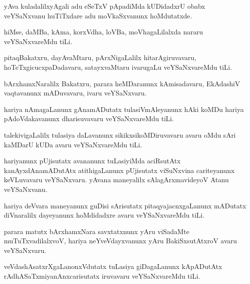 \begin{mng}
yAva kuladalilxyAgali adu eSeTxV pApadiMda kUDidadxrU obabx veYSaNxvanu huTiTxdare adu moVkaSxvanunx hoMdutatxde.
\end{mng}

\begin{mng}
hiMse, daMBa, kAma, korxVdha, loVBa, moVhagaLilalxda nararu veYSaNxvareMdu tiLi.
\end{mng}

\begin{mng}
pitaqBakatxru, dayAvaMtaru, pArxNigaLalilx hitarAgiruvavaru, hoTeTxgicucxpaDadavaru, satayxvaMtaru ivarugaLu veYSaNxvareMdu tiLi.
\end{mng}

\begin{mng}
bArxhamxNaralilx Bakatxru, parara heMDaranunx kAmisadavaru, EkAdashiV vaqtavanunx mADuvavaru, ivaru veYSaNxvaru.
\end{mng}

\begin{mng}
hariya nAmagaLanunx gAnamADutatx tulasiVmAleyanunx hAki koMDu hariya pAdoVdakavanunx dharisuvavaru veYSaNxvareMdu tiLi.
\end{mng}

\begin{mng}
talekivigaLalilx tulasiya daLavanunx sikikxsikoMDiruvavaru avaru oMdu sAri kaMDarU kUDa avaru veYSaNxvareMdu tiLi.
\end{mng}

\begin{mng}
hariyanunx pUjisutatx avananunx tuLasiyiMda aciRsutAtx kanAyxdAnamADutAtx atithigaLanunx pUjisutatx viSuNxvina cariteyanunx keVLuvavaru veYSaNxvaru. yAvana maneyalilx sAlagArxmavideyoV Atanu veYSaNxvanu.
\end{mng}

\begin{mng}
hariya deVvara maneyanunx guDisi sArisutatx pitaqyajacnxgaLanunx mADutatx diVnaralilx dayeyanunx hoMdidadxre avaru veYSaNxvareMdu tiLi.
\end{mng}

\begin{mng}
parara matutx bArxhamxNara savxtatxnunx yAru viSadaMte muTuTxvadilalxvoV, hariya neYveVdayxvanunx yAru BakiSxsutAtxroV avaru veYSaNxvaru.
\end{mng}

\begin{mng}
veVdashAsatxrXgaLanonxVdutatx tuLasiya giDagaLanunx kApADutAtx rAdhASaTxmiyanAnxcarisutatx iruvavaru veYSaNxvareMdu tiLi.
\end{mng}

